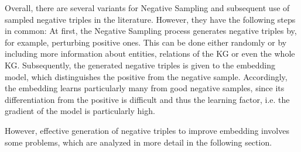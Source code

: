 Overall, there are several variants for Negative Sampling and subsequent use of sampled negative triples in the literature.
However, they have the following steps in common:
At first, the Negative Sampling process generates negative triples by, for example, perturbing positive ones.
This can be done either randomly or by including more information about entities, relations of the \ac{KG} or even the whole \ac{KG}.
Subsequently, the generated negative triples is given to the embedding model, which distinguishes the positive from the negative sample.
Accordingly, the embedding learns particularly many from good negative samples, since its differentiation from the positive is difficult and thus the learning factor, i.e. the gradient of the model is particularly high.

However, effective generation of negative triples to improve embedding involves some problems, which are analyzed in more detail in the following section.





